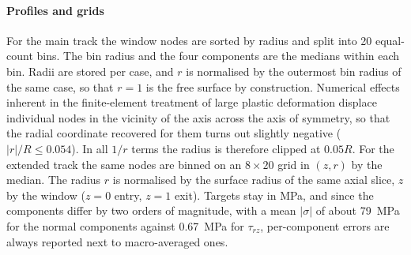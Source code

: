 \documentclass[subscriptcorrection,upint,varvw,barcolor=Goldenrod3,mathalfa=cal=euler,balance,hyphenate,french,pdf-a]{asmejour} %
\begin{document}
\paragraph{Profiles and grids}
For the main track the window nodes are sorted by radius and split into 20 equal-count bins. The bin radius and the four components are the medians within each bin. %
Radii are stored per case, and $r$ is normalised by the outermost bin radius of the same case, so that $r=1$ is the free surface by construction. %
Numerical effects inherent in the finite-element treatment of large plastic deformation displace individual nodes in the vicinity of the axis across the axis of symmetry, so that the radial coordinate recovered for them turns out slightly negative ($|r|/R \le 0.054$). In all $1/r$ terms the radius is therefore clipped at $0.05R$. %
For the extended track the same nodes are binned on an $8\times20$ grid in $(z,r)$ by the median. The radius $r$ is normalised by the surface radius of the same axial slice, $z$ by the window ($z=0$ entry, $z=1$ exit). %
Targets stay in MPa, and since the components differ by two orders of magnitude, with a mean $|\sigma|$ of about 79~MPa for the normal components against 0.67~MPa for $\tau_{rz}$, per-component errors are always reported next to macro-averaged ones. %
\end{document}
